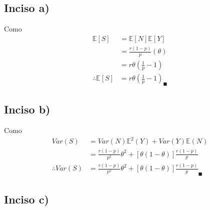\documentclass[
]{article}
\begin{document}
\hypertarget{inciso-a-1}{%
\subsection{Inciso a)}\label{inciso-a-1}}

Como \begin{align*}
\mathbb{E}[S] &= \mathbb{E}[N] \mathbb{E}[Y]\\
              &= \frac{r (1 - p)}{p}(\theta)\\
              &= r\theta \left(\frac{1}{p} - 1\right)\\
\therefore \mathbb{E}[S] &= r\theta \left(\frac{1}{p} - 1\right)_\blacksquare
\end{align*}

\hypertarget{inciso-b-1}{%
\subsection{Inciso b)}\label{inciso-b-1}}

Como \begin{align*}
Var(S) &= Var(N) \mathbb{E}^{2}(Y) + Var(Y) \mathbb{E}(N)\\
       &= \frac{r(1 - p)}{p^{2}}\theta^{2} + [\theta(1 - \theta)] \frac{r (1 - p)}{p}\\
\therefore Var(S) &= \frac{r(1 - p)}{p^{2}}\theta^{2} + [\theta(1 - \theta)] \frac{r (1 - p)}{p}_\blacksquare
\end{align*}

\hypertarget{inciso-c-1}{%
\subsection{Inciso c)}\label{inciso-c-1}}
\end{document}
